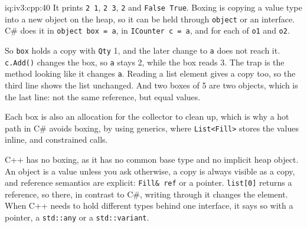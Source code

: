 \begin{solution}{iq:iv3:cpp:40}
It prints \texttt{2 1}, \texttt{2 3}, \texttt{2} and \texttt{False True}. Boxing is copying a value type into a new object on the heap, so it can be held through \texttt{object} or an interface. C\# does it in \texttt{object box = a}, in \texttt{ICounter c = a}, and for each of \texttt{o1} and \texttt{o2}.

So \texttt{box} holds a copy with \texttt{Qty} 1, and the later change to \texttt{a} does not reach it. \texttt{c.Add()} changes the box, so \texttt{a} stays 2, while the box reads 3. The trap is the method looking like it changes \texttt{a}. Reading a list element gives a copy too, so the third line shows the list unchanged. And two boxes of 5 are two objects, which is the last line: not the same reference, but equal values.

Each box is also an allocation for the collector to clean up, which is why a hot path in C\# avoids boxing, by using generics, where \texttt{List<Fill>} stores the values inline, and constrained calls.

C++ has no boxing, as it has no common base type and no implicit heap object. An object is a value unless you ask otherwise, a copy is always visible as a copy, and reference semantics are explicit: \texttt{Fill\& ref} or a pointer. \texttt{list[0]} returns a reference, so there, in contrast to C\#, writing through it changes the element. When C++ needs to hold different types behind one interface, it says so with a pointer, a \texttt{std::any} or a \texttt{std::variant}.

\end{solution}


